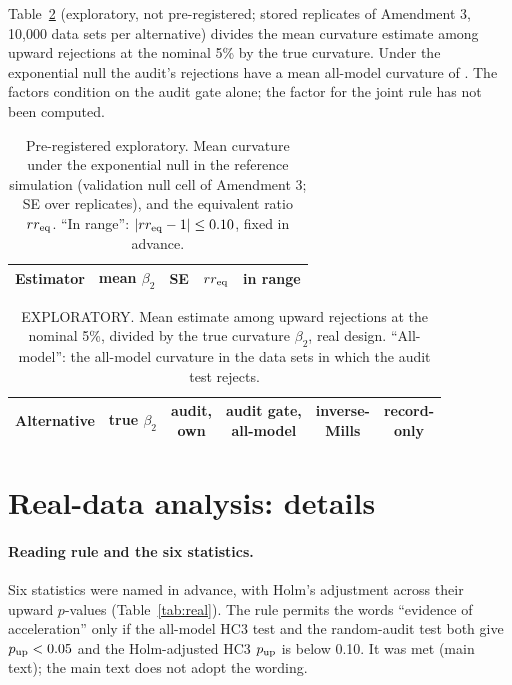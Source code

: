\documentclass[aps,pre,twocolumn,superscriptaddress,nofootinbib,9pt]{revtex4-2}
\newcommand{\rreq}{rr_{\rm eq}}
\begin{document}
Table~\ref{tab:typem} (exploratory, not pre-registered; stored replicates of Amendment 3, 10{,}000 data sets per alternative) divides the mean curvature estimate among upward rejections at the nominal 5\% by the true curvature. Under the exponential null the audit's rejections have a mean all-model curvature of \typeMAllGivenNull. The factors condition on the audit gate alone; the factor for the joint rule has not been computed.

\begin{table}[H]
\caption{Pre-registered exploratory. Mean curvature under the exponential null in the reference simulation (validation null cell of Amendment 3; SE over replicates), and the equivalent ratio $\rreq$. ``In range'': $|\rreq-1|\le0.10$, fixed in advance.}
\label{tab:bias}
\begin{ruledtabular}
\begin{tabular}{lcccc}
Estimator & mean $\beta_2$ & SE & $\rreq$ & in range \\
\hline

\end{tabular}
\end{ruledtabular}
\end{table}

\begin{table}[H]
\caption{EXPLORATORY. Mean estimate among upward rejections at the nominal 5\%, divided by the true curvature $\beta_2$, real design. ``All-model'': the all-model curvature in the data sets in which the audit test rejects.}
\label{tab:typem}
\begin{ruledtabular}
\begin{tabular}{lccccc}
Alternative & true $\beta_2$ & \shortstack{audit,\\own} & \shortstack{audit gate,\\all-model} & \shortstack{inverse-\\Mills} & \shortstack{record-\\only} \\
\hline

\end{tabular}
\end{ruledtabular}
\end{table}

\section{Real-data analysis: details}\label{sup:real}
\paragraph*{Reading rule and the six statistics.} Six statistics were named in advance, with Holm's adjustment across their upward $p$-values (Table~\ref{tab:real}). The rule permits the words ``evidence of acceleration'' only if the all-model HC3 test and the random-audit test both give $p_{\rm up}<0.05$ and the Holm-adjusted HC3 $p_{\rm up}$ is below 0.10. It was met (main text); the main text does not adopt the wording.
\end{document}
